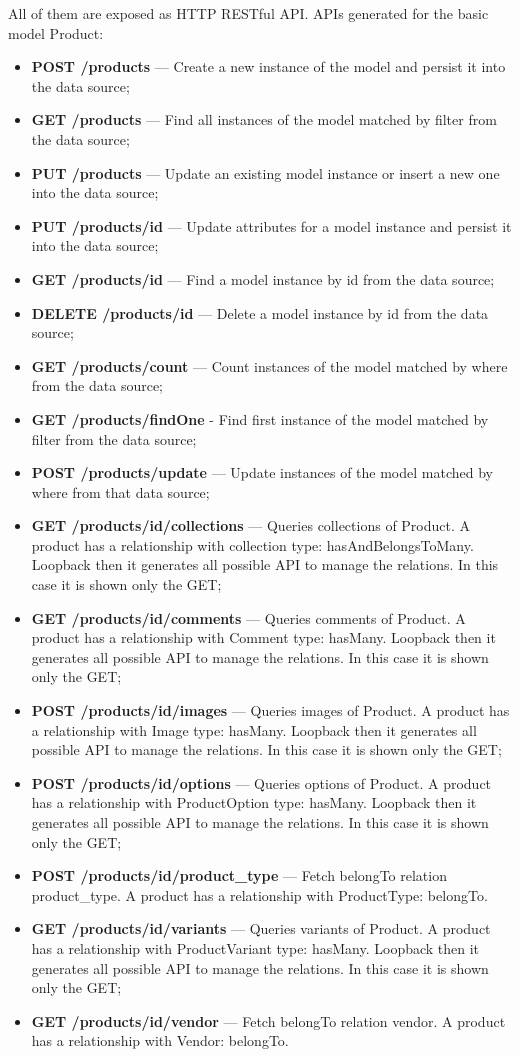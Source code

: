 All of them are exposed as HTTP RESTful API. APIs generated for the basic model Product:
\begin{itemize}
\item \textbf{POST /products} — Create a new instance of the model and persist it into the data source;
\item \textbf{GET /products} —  Find all instances of the model matched by filter from the data source;
\item \textbf{PUT /products} — Update an existing model instance or insert a new one into the data source;
\item \textbf{PUT /products/id} — Update attributes for a model instance and persist it into the data source;
\item \textbf{GET /products/id} — Find a model instance by id from the data source;
\item \textbf{DELETE /products/id} — Delete a model instance by id from the data source;
\item \textbf{GET  /products/count} — Count instances of the model matched by where from the data source;
\item \textbf{GET /products/findOne}  - Find first instance of the model matched by filter from the data source;
\item \textbf{POST /products/update} — Update instances of the model matched by where from that data source;
\item \textbf{GET /products/id/collections} — Queries collections of Product. A product has a relationship with collection type: hasAndBelongsToMany. Loopback then it generates all possible API to manage the relations. In this case it is shown only the GET;
\item \textbf{GET  /products/id/comments} — Queries comments of Product. A product has a relationship with Comment type: hasMany. Loopback then it generates all possible API to manage the relations. In this case it is shown only the GET;
\item \textbf{POST /products/id/images} — Queries images of Product. A product has a relationship with Image type: hasMany. Loopback then it generates all possible API to manage the relations. In this case it is shown only the GET;
\item \textbf{POST /products/id/options} — Queries options of Product. A product has a relationship with ProductOption type: hasMany. Loopback then it generates all possible API to manage the relations. In this case it is shown only the GET;
\item \textbf{POST /products/id/product\_type} — Fetch belongTo relation product\_type. A product has a relationship with ProductType: belongTo.
\item \textbf{GET  /products/id/variants} — Queries variants of Product. A product has a relationship with ProductVariant type: hasMany. Loopback then it generates all possible API to manage the relations. In this case it is shown only the GET;
\item \textbf{GET /products/id/vendor} — Fetch belongTo relation vendor. A product has a relationship with Vendor: belongTo.
\end{itemize}
